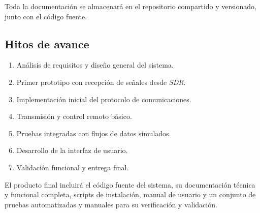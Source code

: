 Toda la documentación se almacenará en el repositorio compartido y versionado, junto con el código fuente.

\subsection*{Hitos de avance}

\begin{enumerate}
    \item Análisis de requisitos y diseño general del sistema.
    \item Primer prototipo con recepción de señales desde \textit{SDR}.
    \item Implementación inicial del protocolo de comunicaciones.
    \item Transmisión y control remoto básico.
    \item Pruebas integradas con flujos de datos simulados.
    \item Desarrollo de la interfaz de usuario.
    \item Validación funcional y entrega final.
\end{enumerate}

El producto final incluirá el código fuente del sistema, su documentación técnica y funcional completa, scripts de instalación, manual de usuario y un conjunto de pruebas automatizadas y manuales para su verificación y validación.